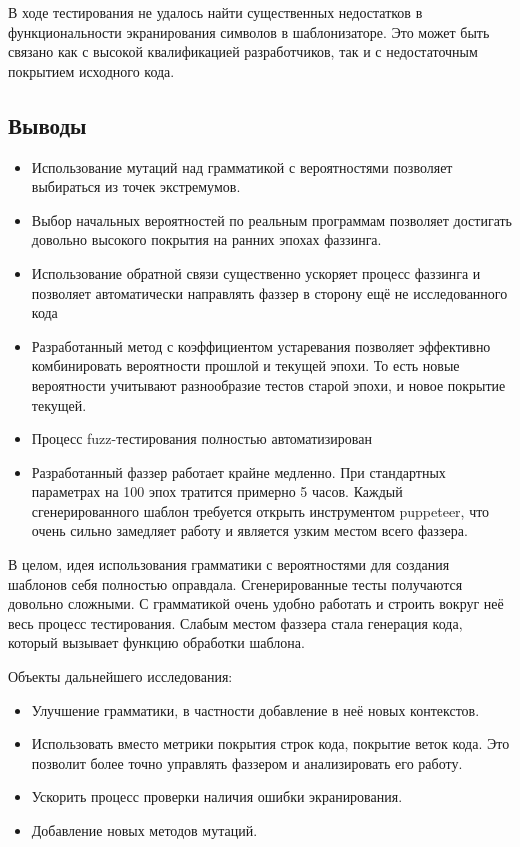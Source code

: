 \documentclass[a4paper]{article}
\begin{document}
В ходе тестирования не удалось найти существенных недостатков в функциональности экранирования символов в шаблонизаторе. Это может быть связано как с высокой квалификацией разработчиков, так и с недостаточным покрытием исходного кода.

 
\subsection{Выводы}

\begin{itemize}
    \item Использование мутаций над грамматикой с вероятностями позволяет выбираться из точек экстремумов.
    \item Выбор начальных вероятностей по реальным программам позволяет достигать довольно высокого покрытия на ранних эпохах фаззинга.
    \item Использование обратной связи существенно ускоряет процесс фаззинга и позволяет автоматически направлять фаззер в сторону ещё не исследованного кода
    \item Разработанный метод с коэффициентом устаревания позволяет эффективно комбинировать вероятности прошлой и текущей эпохи. То есть новые вероятности учитывают разнообразие тестов старой эпохи, и новое покрытие текущей.
    \item Процесс fuzz-тестирования полностью автоматизирован
    \item Разработанный фаззер работает крайне медленно. При стандартных параметрах на 100 эпох тратится примерно 5 часов. Каждый сгенерированного шаблон требуется открыть инструментом puppeteer, что очень сильно замедляет работу и является узким местом всего фаззера.
\end{itemize}
В целом, идея использования грамматики с вероятностями для создания шаблонов себя полностью оправдала. Сгенерированные тесты получаются довольно сложными. С грамматикой очень удобно работать и строить вокруг неё весь процесс тестирования. Слабым местом фаззера стала генерация кода, который вызывает функцию обработки шаблона. 

Объекты дальнейшего исследования:

\begin{itemize}
    \item Улучшение грамматики, в частности добавление в неё новых контекстов.
    \item Использовать вместо метрики покрытия строк кода, покрытие веток кода. Это позволит более точно управлять фаззером и анализировать его работу.
    \item Ускорить процесс проверки наличия ошибки экранирования.
    \item Добавление новых методов мутаций.
\end{itemize}
\end{document}
